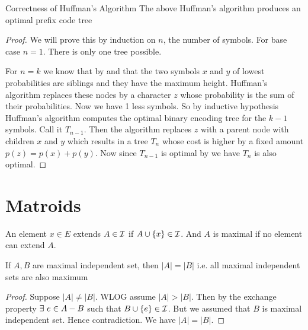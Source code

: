 \begin{Theorem}{Correctness of Huffman's Algorithm}{}
	The above Huffman's algorithm produces an optimal prefix code tree
\end{Theorem}
\begin{proof}
	We will prove this by induction on $n$, the number of symbols. For base case $n=1$. There is only one tree possible.
	
	For $n=k$ we know that by  and  that the two symbols $x$ and $y$ of lowest probabilities are siblings and they have the maximum height. Huffman's algorithm replaces these nodes by a character $z$ whose probability is the sum of their probabilities. Now we have 1 less symbols. So by inductive hypothesis Huffman's algorithm computes the optimal binary encoding tree for the $k-1$ symbols. Call it $T_{n-1}$. Then the algorithm replaces $z$ with a parent node with children $x$ and $y$ which results in a tree $T_n$ whose cost is higher by a fixed amount $p(z)=p(x)+p(y)$. Now since $T_{n-1}$ is optimal by  we have $T_n$ is also optimal.
\end{proof}
\section{Matroids}
An element $x\in E$ extends $A\in\mathcal{I}$ if $A\cup \{x\}\in\mathcal{I}$. And $A$ is maximal if no element can extend $A$.
\begin{lemma}{}{}
	If $A,B$ are maximal independent set, then $|A|=|B|$ i.e. all maximal independent sets are also maximum
\end{lemma}
\begin{proof}
	Suppose $|A|\neq |B|$. WLOG assume $|A|>|B|$. Then by the exchange property $\exists\ e\in A-B$ such that $B\cup \{e\}\in\mathcal{I}$. But we assumed that $B$ is maximal independent set. Hence contradiction. We have $|A|=|B|$.
\end{proof}
\parinf


